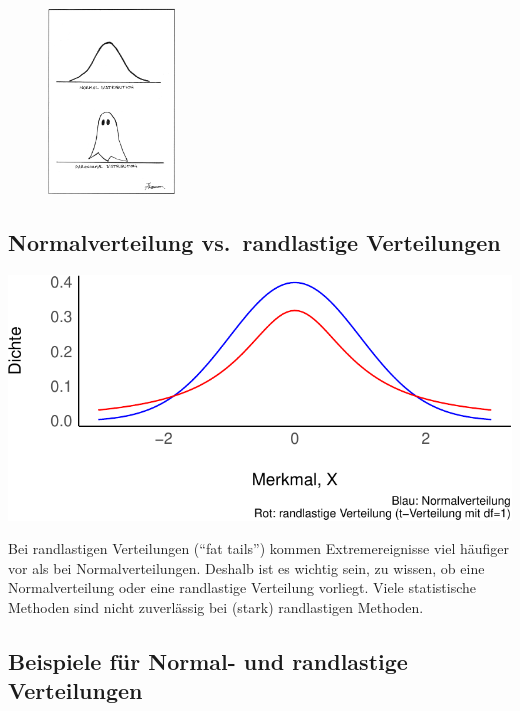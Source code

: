\documentclass[
  a4paper,
  DIV=11]{scrreprt}
\theoremstyle{definition}
\theoremstyle{remark}
\begin{document}
\begin{figure}

{\centering \includegraphics[width=0.3\textwidth,height=\textheight]{./img/ch33910f1.jpg}

}

\end{figure}

\hypertarget{normalverteilung-vs.-randlastige-verteilungen}{%
\subsection{Normalverteilung vs.~randlastige
Verteilungen}\label{normalverteilung-vs.-randlastige-verteilungen}}

\includegraphics{./Verteilungen_files/figure-pdf/Normalverteilung-9-1.pdf}

Bei randlastigen Verteilungen (``fat tails'') kommen Extremereignisse
viel häufiger vor als bei Normalverteilungen. Deshalb ist es wichtig
sein, zu wissen, ob eine Normalverteilung oder eine randlastige
Verteilung vorliegt. Viele statistische Methoden sind nicht zuverlässig
bei (stark) randlastigen Methoden.

\hypertarget{beispiele-fuxfcr-normal--und-randlastige-verteilungen}{%
\subsection{Beispiele für Normal- und randlastige
Verteilungen}\label{beispiele-fuxfcr-normal--und-randlastige-verteilungen}}
\end{document}
